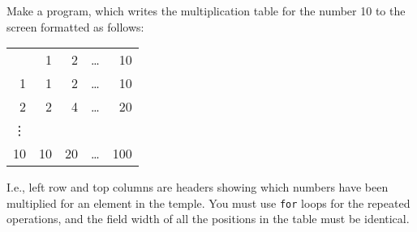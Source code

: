 \label{multiplicationTable} Make a program, which writes the
multiplication table for the number 10 to the screen formatted as
follows:
\begin{center}
  \begin{tabular}{rrrrr}
    &1 & 2 & \dots & 10\\
    1 &1 & 2 & \dots & 10\\
    2 &2 & 4 & \dots & 20\\
    \vdots \\
    10 &10 & 20 & \dots & 100\\
  \end{tabular}
\end{center}
I.e., left row and top columns are headers showing which numbers have
been multiplied for an element in the temple. You must use
\lstinline!for!  loops for the repeated operations, and the field
width of all the positions in the table must be identical.
